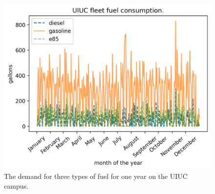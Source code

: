 \begin{figure}[H]
  \centering
  \includegraphics[width=\textwidth]{uiuc_fueldemand}
  \caption{The demand for three types of fuel for one year on the UIUC campus.}
  \label{fig:fueldemand}
\end{figure}
